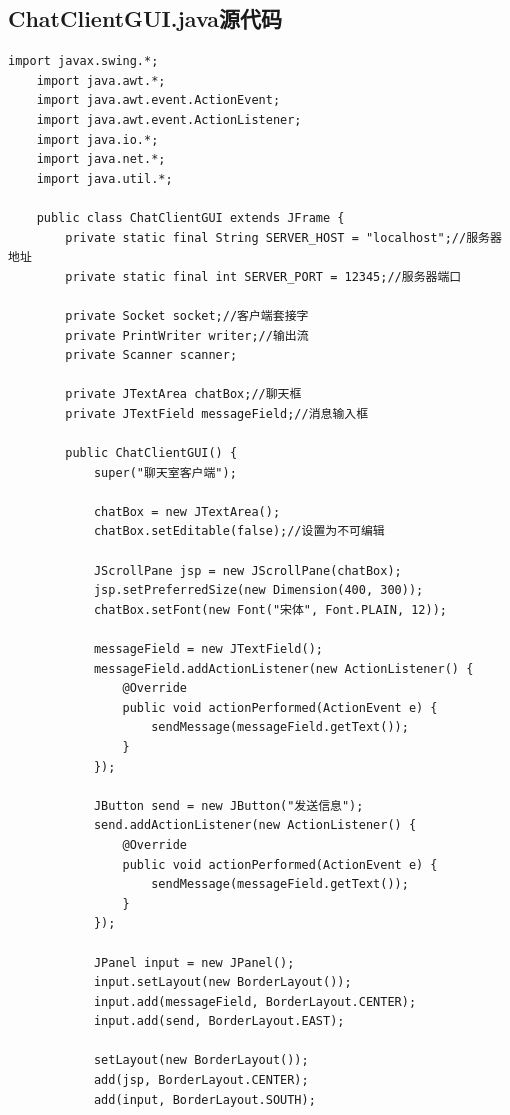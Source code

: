 \documentclass[UTF8,12pt]{article}
\begin{document}
\subsection{ChatClientGUI.java源代码}
\begin{lstlisting}[title=ChatClientGUI.java源代码,frame=shadowbox]
    import javax.swing.*;
    import java.awt.*;
    import java.awt.event.ActionEvent;
    import java.awt.event.ActionListener;
    import java.io.*;
    import java.net.*;
    import java.util.*;
    
    public class ChatClientGUI extends JFrame {
        private static final String SERVER_HOST = "localhost";//服务器地址
        private static final int SERVER_PORT = 12345;//服务器端口
    
        private Socket socket;//客户端套接字
        private PrintWriter writer;//输出流
        private Scanner scanner;
    
        private JTextArea chatBox;//聊天框
        private JTextField messageField;//消息输入框
    
        public ChatClientGUI() {
            super("聊天室客户端");
    
            chatBox = new JTextArea();
            chatBox.setEditable(false);//设置为不可编辑
    
            JScrollPane jsp = new JScrollPane(chatBox);
            jsp.setPreferredSize(new Dimension(400, 300));
            chatBox.setFont(new Font("宋体", Font.PLAIN, 12));
    
            messageField = new JTextField();
            messageField.addActionListener(new ActionListener() {
                @Override
                public void actionPerformed(ActionEvent e) {
                    sendMessage(messageField.getText());
                }
            });
    
            JButton send = new JButton("发送信息");
            send.addActionListener(new ActionListener() {
                @Override
                public void actionPerformed(ActionEvent e) {
                    sendMessage(messageField.getText());
                }
            });
    
            JPanel input = new JPanel();
            input.setLayout(new BorderLayout());
            input.add(messageField, BorderLayout.CENTER);
            input.add(send, BorderLayout.EAST);
    
            setLayout(new BorderLayout());
            add(jsp, BorderLayout.CENTER);
            add(input, BorderLayout.SOUTH);
    

\end{lstlisting}
\end{document}
